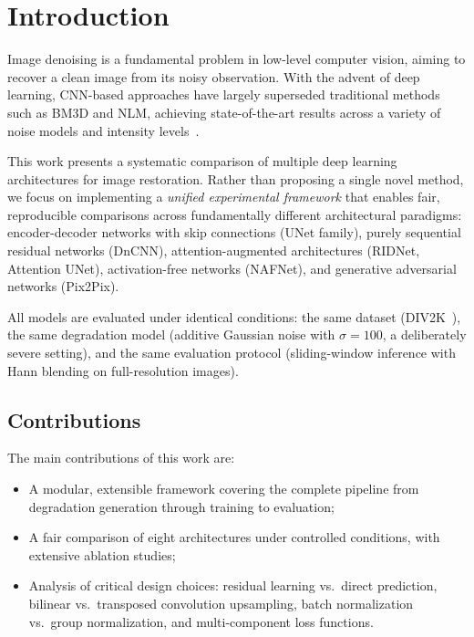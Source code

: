 \section{Introduction}
\label{sec:introduction}

Image denoising is a fundamental problem in low-level computer vision, aiming to recover a clean image from its noisy observation. With the advent of deep learning, CNN-based approaches have largely superseded traditional methods such as BM3D and NLM, achieving state-of-the-art results across a variety of noise models and intensity levels~\cite{dncnn}.

This work presents a systematic comparison of multiple deep learning architectures for image restoration. Rather than proposing a single novel method, we focus on implementing a \emph{unified experimental framework} that enables fair, reproducible comparisons across fundamentally different architectural paradigms: encoder-decoder networks with skip connections (UNet family), purely sequential residual networks (DnCNN), attention-augmented architectures (RIDNet, Attention UNet), activation-free networks (NAFNet), and generative adversarial networks (Pix2Pix).

All models are evaluated under identical conditions: the same dataset (DIV2K~\cite{div2k}), the same degradation model (additive Gaussian noise with $\sigma = 100$, a deliberately severe setting), and the same evaluation protocol (sliding-window inference with Hann blending on full-resolution images).

\subsection{Contributions}

The main contributions of this work are:
\begin{itemize}
    \item A modular, extensible framework covering the complete pipeline from degradation generation through training to evaluation;
    \item A fair comparison of eight architectures under controlled conditions, with extensive ablation studies;
    \item Analysis of critical design choices: residual learning vs.\ direct prediction, bilinear vs.\ transposed convolution upsampling, batch normalization vs.\ group normalization, and multi-component loss functions.
\end{itemize}

